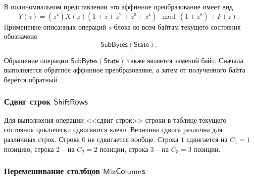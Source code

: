 В полиномиальном представлении это аффинное преобразование имеет вид
\[Y(z)=(z^4)X(z)(1+z+z^2+z^3+z^4)\mod(1+z^8) + F(z).\]
Применение описанных операций $s$-блока ко всем байтам текущего состояния обозначено
    \[ \mathsf{SubBytes(State)}. \]

Обращение операции $\mathsf{SubBytes(State)}$ также является заменой байт. Сначала выполняется обратное аффинное преобразование, а затем от полученного байта берётся обратный.


\subsubsection{Сдвиг строк $\mathsf{ShiftRows}$}

Для выполнения операции <<сдвиг строк>> строки в таблице текущего состояния циклически сдвигаются влево. Величина сдвига различна для различных строк. Строка $0$ не сдвигается вообще. Строка $1$ сдвигается на $C_1=1$ позицию, строка $2$ -- на $C_2=2$ позиции, строка $3$ -- на $C_3=3$ позиции.
%


\subsubsection{Перемешивание столбцов $\mathsf{Mix Columns}$}

